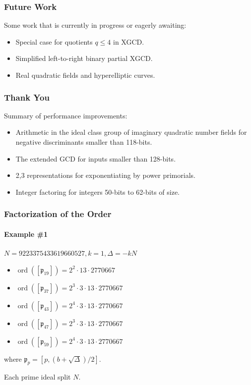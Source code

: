 \documentclass{beamer}
\DeclareMathOperator{\ord}{ord}
\newcommand{\ideal}{\mathfrak}
\newcommand{\idealclass}[1]{\left[ \ideal #1 \right]}
\begin{document}
\begin{frame}
\frametitle{Future Work}
Some work that is currently in progress or eagerly awaiting:
\begin{itemize}
\item Special case for quotients $q \le 4$ in XGCD.
\item Simplified left-to-right binary partial XGCD.
\item Real quadratic fields and hyperelliptic curves.
\end{itemize}
\end{frame}

\begin{frame}
\frametitle{Thank You}
Summary of performance improvements:
\begin{itemize}
\item Arithmetic in the ideal class group of imaginary quadratic number fields for negative discriminants smaller than 118-bits.
\item The extended GCD for inputs smaller than 128-bits.
\item 2,3 representations for exponentiating by power primorials.
\item Integer factoring for integers 50-bits to 62-bits of size.
\end{itemize}
\end{frame}



\begin{frame}
\frametitle{Factorization of the Order}
\framesubtitle{Example \#1}

$N = 9223375433619660527, k = 1, \Delta = -kN$
\begin{itemize}
\item $\ord(\idealclass{p_{19}}) = 2^2 \cdot 13 \cdot 2770667$
\item $\ord(\idealclass{p_{37}}) = 2^3 \cdot 3 \cdot 13 \cdot 2770667$
\item $\ord(\idealclass{p_{43}}) = 2^4 \cdot 3 \cdot 13 \cdot 2770667$
\item $\ord(\idealclass{p_{47}}) = 2^3 \cdot 3 \cdot 13 \cdot 2770667$
\item $\ord(\idealclass{p_{59}}) = 2^4 \cdot 3 \cdot 13 \cdot 2770667$
\end{itemize}

where $\ideal p_p = [p, (b + \sqrt\Delta)/2]$.

\bigskip
Each prime ideal split $N$.

\end{frame}
\end{document}
